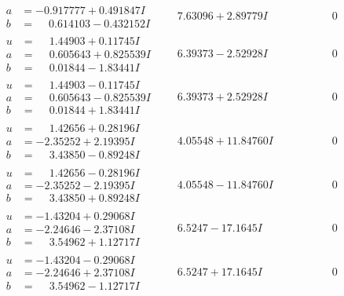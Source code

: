 \documentclass[1p]{elsarticle_modified}
\theoremstyle{definition}
\begin{document}
$$\begin{array}{c|c|c}
\begin{aligned}
a &= -0.917777 + 0.491847 I \\
b &= \phantom{-}0.614103 - 0.432152 I\end{aligned}
 & \phantom{-}7.63096 + 2.89779 I & \phantom{-0.000000 } 0 \\ \hline\begin{aligned}
u &= \phantom{-}1.44903 + 0.11745 I \\
a &= \phantom{-}0.605643 + 0.825539 I \\
b &= \phantom{-}0.01844 - 1.83441 I\end{aligned}
 & \phantom{-}6.39373 - 2.52928 I & \phantom{-0.000000 } 0 \\ \hline\begin{aligned}
u &= \phantom{-}1.44903 - 0.11745 I \\
a &= \phantom{-}0.605643 - 0.825539 I \\
b &= \phantom{-}0.01844 + 1.83441 I\end{aligned}
 & \phantom{-}6.39373 + 2.52928 I & \phantom{-0.000000 } 0 \\ \hline\begin{aligned}
u &= \phantom{-}1.42656 + 0.28196 I \\
a &= -2.35252 + 2.19395 I \\
b &= \phantom{-}3.43850 - 0.89248 I\end{aligned}
 & \phantom{-}4.05548 + 11.84760 I & \phantom{-0.000000 } 0 \\ \hline\begin{aligned}
u &= \phantom{-}1.42656 - 0.28196 I \\
a &= -2.35252 - 2.19395 I \\
b &= \phantom{-}3.43850 + 0.89248 I\end{aligned}
 & \phantom{-}4.05548 - 11.84760 I & \phantom{-0.000000 } 0 \\ \hline\begin{aligned}
u &= -1.43204 + 0.29068 I \\
a &= -2.24646 - 2.37108 I \\
b &= \phantom{-}3.54962 + 1.12717 I\end{aligned}
 & \phantom{-}6.5247 - 17.1645 I & \phantom{-0.000000 } 0 \\ \hline\begin{aligned}
u &= -1.43204 - 0.29068 I \\
a &= -2.24646 + 2.37108 I \\
b &= \phantom{-}3.54962 - 1.12717 I\end{aligned}
 & \phantom{-}6.5247 + 17.1645 I & \phantom{-0.000000 } 0 \\ \hline\begin{aligned}

\end{aligned}
\end{array}$$
\end{document}

